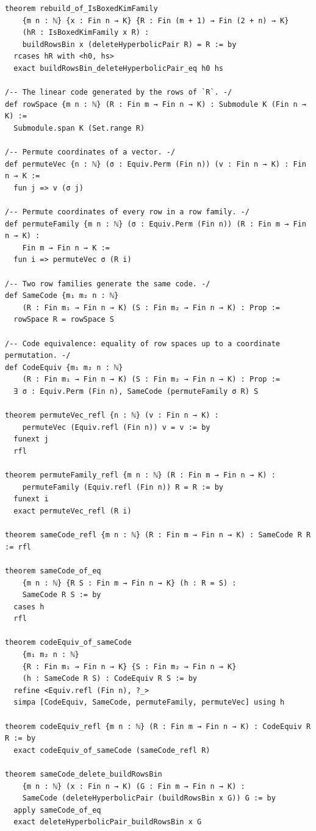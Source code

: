\documentclass[12pt]{article}
\begin{document}
\begin{lstlisting}[caption={Lean verification for Theorem~\ref{thm:CZ_Kim_Lagrangian}.}]
theorem rebuild_of_IsBoxedKimFamily
    {m n : ℕ} {x : Fin n → K} {R : Fin (m + 1) → Fin (2 + n) → K}
    (hR : IsBoxedKimFamily x R) :
    buildRowsBin x (deleteHyperbolicPair R) = R := by
  rcases hR with <h0, hs>
  exact buildRowsBin_deleteHyperbolicPair_eq h0 hs

/-- The linear code generated by the rows of `R`. -/
def rowSpace {m n : ℕ} (R : Fin m → Fin n → K) : Submodule K (Fin n → K) :=
  Submodule.span K (Set.range R)

/-- Permute coordinates of a vector. -/
def permuteVec {n : ℕ} (σ : Equiv.Perm (Fin n)) (v : Fin n → K) : Fin n → K :=
  fun j => v (σ j)

/-- Permute coordinates of every row in a row family. -/
def permuteFamily {m n : ℕ} (σ : Equiv.Perm (Fin n)) (R : Fin m → Fin n → K) :
    Fin m → Fin n → K :=
  fun i => permuteVec σ (R i)

/-- Two row families generate the same code. -/
def SameCode {m₁ m₂ n : ℕ}
    (R : Fin m₁ → Fin n → K) (S : Fin m₂ → Fin n → K) : Prop :=
  rowSpace R = rowSpace S

/-- Code equivalence: equality of row spaces up to a coordinate permutation. -/
def CodeEquiv {m₁ m₂ n : ℕ}
    (R : Fin m₁ → Fin n → K) (S : Fin m₂ → Fin n → K) : Prop :=
  ∃ σ : Equiv.Perm (Fin n), SameCode (permuteFamily σ R) S

theorem permuteVec_refl {n : ℕ} (v : Fin n → K) :
    permuteVec (Equiv.refl (Fin n)) v = v := by
  funext j
  rfl

theorem permuteFamily_refl {m n : ℕ} (R : Fin m → Fin n → K) :
    permuteFamily (Equiv.refl (Fin n)) R = R := by
  funext i
  exact permuteVec_refl (R i)

theorem sameCode_refl {m n : ℕ} (R : Fin m → Fin n → K) : SameCode R R := rfl

theorem sameCode_of_eq
    {m n : ℕ} {R S : Fin m → Fin n → K} (h : R = S) :
    SameCode R S := by
  cases h
  rfl

theorem codeEquiv_of_sameCode
    {m₁ m₂ n : ℕ}
    {R : Fin m₁ → Fin n → K} {S : Fin m₂ → Fin n → K}
    (h : SameCode R S) : CodeEquiv R S := by
  refine <Equiv.refl (Fin n), ?_>
  simpa [CodeEquiv, SameCode, permuteFamily, permuteVec] using h

theorem codeEquiv_refl {m n : ℕ} (R : Fin m → Fin n → K) : CodeEquiv R R := by
  exact codeEquiv_of_sameCode (sameCode_refl R)

theorem sameCode_delete_buildRowsBin
    {m n : ℕ} (x : Fin n → K) (G : Fin m → Fin n → K) :
    SameCode (deleteHyperbolicPair (buildRowsBin x G)) G := by
  apply sameCode_of_eq
  exact deleteHyperbolicPair_buildRowsBin x G


\end{lstlisting}
\end{document}
